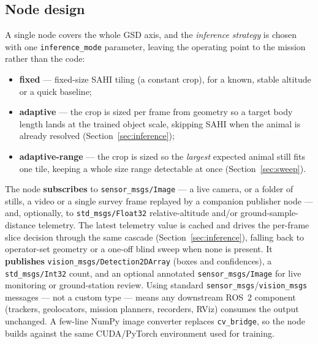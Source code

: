 \documentclass[11pt,a4paper]{article}
\begin{document}
\subsection{Node design}
A single node covers the whole GSD axis, and the \emph{inference strategy} is
chosen with one \texttt{inference\_mode} parameter, leaving the operating point
to the mission rather than the code:
\begin{itemize}[itemsep=2pt,topsep=2pt]
  \item \textbf{fixed} --- fixed-size SAHI tiling (a constant crop), for a known,
  stable altitude or a quick baseline;
  \item \textbf{adaptive} --- the crop is sized per frame from geometry so a
  target body length lands at the trained object scale, skipping SAHI when the
  animal is already resolved (Section~\ref{sec:inference});
  \item \textbf{adaptive-range} --- the crop is sized so the \emph{largest}
  expected animal still fits one tile, keeping a whole size range detectable at
  once (Section~\ref{sec:sweep}).
\end{itemize}
The node \textbf{subscribes} to \texttt{sensor\_msgs/Image} --- a live camera, or a
folder of stills, a video or a single survey frame replayed by a companion
publisher node --- and, optionally, to \texttt{std\_msgs/Float32} relative-altitude
and/or ground-sample-distance telemetry. The latest telemetry value is cached and
drives the per-frame slice decision through the same cascade
(Section~\ref{sec:inference}), falling back to operator-set geometry or a one-off
blind sweep when none is present. It \textbf{publishes}
\texttt{vision\_msgs/Detection2DArray} (boxes and confidences), a
\texttt{std\_msgs/Int32} count, and an optional annotated
\texttt{sensor\_msgs/Image} for live monitoring or ground-station review. Using
standard \texttt{sensor\_msgs}/\texttt{vision\_msgs} messages --- not a custom type
--- means any downstream ROS~2 component (trackers, geolocators, mission planners,
recorders, RViz) consumes the output unchanged. A few-line NumPy image converter
replaces \texttt{cv\_bridge}, so the node builds against the same CUDA/PyTorch
environment used for training.
\end{document}
